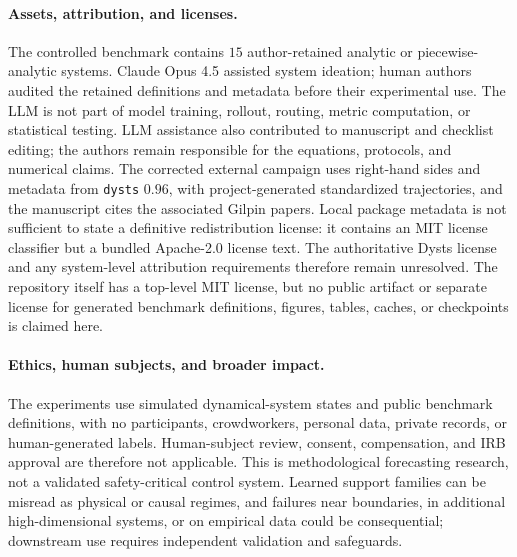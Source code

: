 \paragraph{Assets, attribution, and licenses.}
The controlled benchmark contains \(15\) author-retained analytic or
piecewise-analytic systems.
Claude Opus 4.5 assisted system ideation; human authors audited the retained
definitions and metadata before their experimental use.  The LLM is not part
of model training, rollout, routing, metric computation, or statistical
testing.  LLM assistance also contributed to manuscript and checklist editing;
the authors remain responsible for the equations, protocols, and numerical
claims.
The corrected external campaign uses right-hand sides and metadata from
\texttt{dysts} \(0.96\), with project-generated standardized trajectories, and
the manuscript cites the associated Gilpin papers.  Local package metadata is
not sufficient to state a definitive redistribution license: it contains an
MIT license classifier but a bundled Apache-2.0 license text.  The authoritative
Dysts license and any system-level attribution requirements therefore remain
unresolved.  The repository itself has a top-level MIT license, but no public
artifact or separate license for generated benchmark definitions, figures,
tables, caches, or checkpoints is claimed here.
\paragraph{Ethics, human subjects, and broader impact.}
The experiments use simulated dynamical-system states and public benchmark
definitions, with no participants, crowdworkers, personal data, private
records, or human-generated labels.  Human-subject review, consent,
compensation, and IRB approval are therefore not applicable.  This is
methodological forecasting research, not a validated safety-critical control
system.  Learned support families can be misread as physical or causal regimes,
and failures near boundaries, in additional high-dimensional systems, or on
empirical data could be consequential; downstream use requires independent
validation and safeguards.
\endgroup
